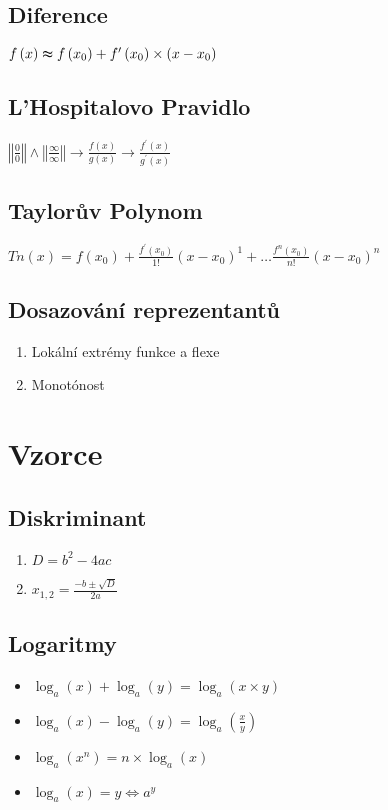 \documentclass{article}
\begin{document}
\begin{multicols}{2}
\subsection{Diference}
$f\left(x\right)\thickapprox f\left(x_{0}\right)+f^{\prime}\left(x_{0}\right)\times\left(x-x_{0}\right)$
\subsection{L'Hospitalovo Pravidlo}
$\left\Vert \frac{0}{0}\right\Vert \wedge\left\Vert \frac{\infty}{\infty}\right\Vert \rightarrow\frac{f\left(x\right)}{g\left(x\right)}\rightarrow\frac{f^{\prime}\left(x\right)}{g^{\prime}\left(x\right)}$
\subsection{Taylorův Polynom}
$Tn\left(x\right)=f\left(x_{0}\right)+\frac{f^{\prime}\left(x_{0}\right)}{1!}\left(x-x_{0}\right)^{1}+\ldots\frac{f^{n}\left(x_{0}\right)}{n!}\left(x-x_{0}\right)^{n}$
\subsection{Dosazování reprezentantů}
\begin{enumerate}
    \item Lokální extrémy funkce a flexe
    \item Monotónost
\end{enumerate}
\section{Vzorce}
\subsection{Diskriminant}
\begin{enumerate}
    \item $D=b^{2}-4ac$
    \item $x_{1,2}=\frac{-b\pm\sqrt{D}}{2a}$
\end{enumerate}
\subsection{Logaritmy}
\begin{itemize}
    \item $\log_{a}\left(x\right)+\log_{a}\left(y\right)=\log_{a}\left(x\times y\right)$
    \item $\log_{a}\left(x\right)-\log_{a}\left(y\right)=\log_{a}\left(\frac{x}{y}\right)$
    \item $\log_{a}\left(x^{n}\right)=n\times\log_{a}\left(x\right)$
    \item $\log_{a}\left(x\right)=y\Leftrightarrow a^{y}$
\end{itemize}

\end{multicols}
\end{document}
